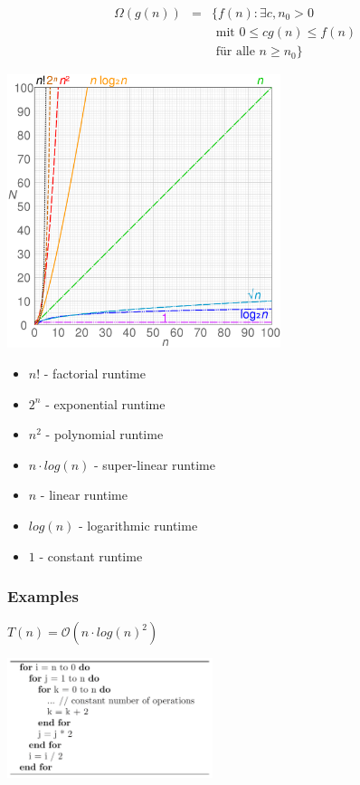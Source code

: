 \documentclass[10pt,a4paper,twocolumn]{article}
\begin{document}
\[
\begin{array}{rcl}
	\Omega(g(n)) & = & \{f(n):\exists c,n_0>0 \\
	& & \text{ mit }0\leq cg(n)\leq f(n) \\
	& & \text{ für alle }n\geq n_0\}
\end{array}
\]

\begin{center}
	\includegraphics[width=8cm]{images/runetimes}
\end{center}

\begin{itemize}
	\item $n!$ - factorial runtime
	\item $2^n$ - exponential runtime
	\item $n^2$ - polynomial runtime
	\item $n \cdot log(n)$ - super-linear runtime
	\item $n$ - linear runtime
	\item $log(n)$ - logarithmic runtime
	\item $1$ - constant runtime 
\end{itemize}


\subsubsection{Examples}
$T(n) = \mathcal{O}(n \cdot log(n)^2)$
\begin{center}
	\includegraphics[width=0.45\textwidth]{images/example_alg_analysis1}
\end{center}
\end{document}
